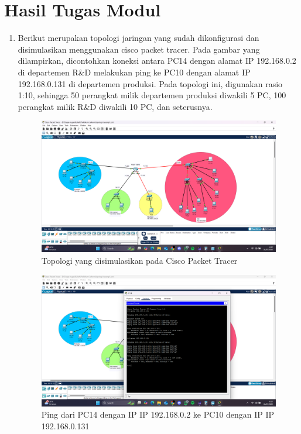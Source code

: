 \section{Hasil Tugas Modul}
\begin{enumerate}
	\item Berikut merupakan topologi jaringan yang sudah dikonfigurasi dan disimulasikan menggunakan cisco packet tracer. Pada gambar yang dilampirkan, dicontohkan koneksi antara PC14 dengan alamat IP 192.168.0.2 di departemen R\&D melakukan ping ke PC10 dengan alamat IP 192.168.0.131 di departemen produksi. Pada topologi ini, digunakan rasio 1:10, sehingga 50 perangkat milik departemen produksi diwakili 5 PC, 100 perangkat milik R\&D diwakili 10 PC, dan seterusnya.
	\begin{figure}[H]
		\centering
		\includegraphics[scale=0.25]{P1/img/tupen topo.png}
		\caption{Topologi yang disimulasikan pada Cisco Packet Tracer}
	\end{figure}
	\begin{figure}[H]
		\centering
		\includegraphics[scale=0.25]{P1/img/tupen ping.png}
		\caption{Ping dari PC14 dengan IP IP 192.168.0.2 ke PC10 dengan IP IP 192.168.0.131}
	\end{figure}
\end{enumerate}

